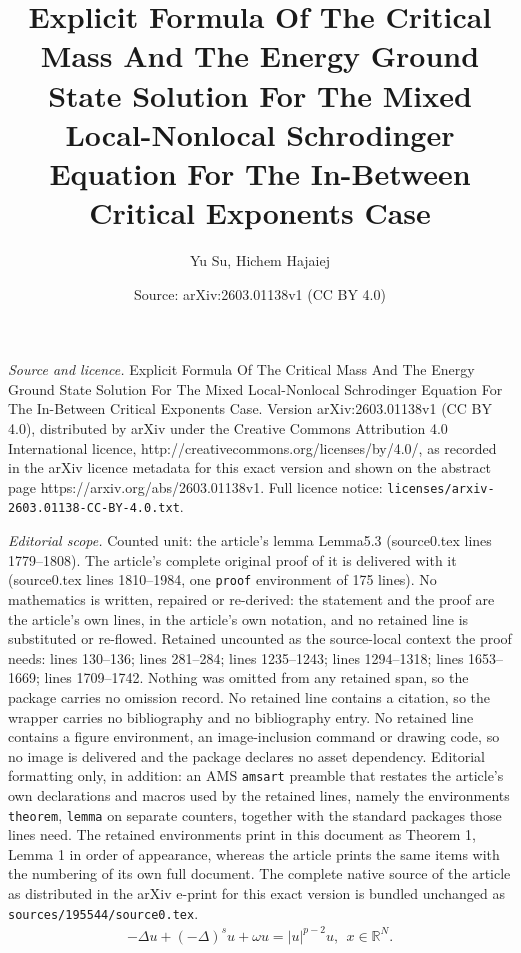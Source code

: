 \documentclass[10pt,a4paper]{amsart}
\title{Explicit Formula Of The Critical Mass And The Energy Ground State Solution For The Mixed Local-Nonlocal Schrodinger Equation For The In-Between Critical Exponents Case}
\author{Yu Su, Hichem Hajaiej}
\date{Source: arXiv:2603.01138v1 (CC BY 4.0)}
\begin{document}
\maketitle

\noindent\emph{Source and licence.} Explicit Formula Of The Critical Mass And The Energy Ground State Solution For The Mixed Local-Nonlocal Schrodinger Equation For The In-Between Critical Exponents Case. Version arXiv:2603.01138v1 (CC BY 4.0), distributed by arXiv under the Creative Commons Attribution 4.0 International licence, http://creativecommons.org/licenses/by/4.0/, as recorded in the arXiv licence metadata for this exact version and shown on the abstract page https://arxiv.org/abs/2603.01138v1. Full licence notice: \texttt{licenses/arxiv-2603.01138-CC-BY-4.0.txt}.\par\smallskip

\noindent\textit{Editorial scope.} Counted unit: the article's lemma Lemma5.3 (source0.tex lines 1779--1808). The article's complete original proof of it is delivered with it (source0.tex lines 1810--1984, one \texttt{proof} environment of 175 lines). No mathematics is written, repaired or re-derived: the statement and the proof are the article's own lines, in the article's own notation, and no retained line is substituted or re-flowed.  Retained uncounted as the source-local context the proof needs: lines 130--136; lines 281--284; lines 1235--1243; lines 1294--1318; lines 1653--1669; lines 1709--1742.  Nothing was omitted from any retained span, so the package carries no omission record.  No retained line contains a citation, so the wrapper carries no bibliography and no bibliography entry.  No retained line contains a figure environment, an image-inclusion command or drawing code, so no image is delivered and the package declares no asset dependency.  Editorial formatting only, in addition: an AMS \texttt{amsart} preamble that restates the article's own declarations and macros used by the retained lines, namely the environments \texttt{theorem}, \texttt{lemma} on separate counters, together with the standard packages those lines need.  The retained environments print in this document as Theorem 1, Lemma 1 in order of appearance, whereas the article prints the same items with the numbering of its own full document.  The complete native source of the article as distributed in the arXiv e-print for this exact version is bundled unchanged as \texttt{sources/195544/source0.tex}.
\begin{equation}\label{MLN}
\begin{aligned}
-\Delta u
+(-\Delta)^{s}u+\omega u=|u|^{p-2}u, \ \ x\in \mathbb{R}^{N}.
\end{aligned}
\tag{MLN}
\end{equation}
\end{document}
